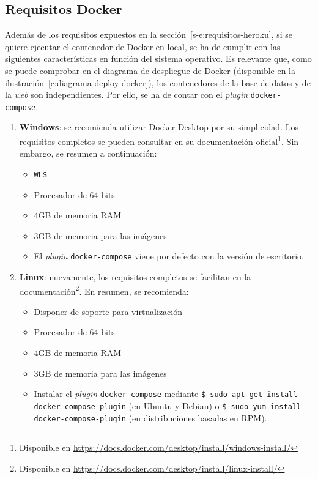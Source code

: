 \subsection{Requisitos Docker}
\label{s-e:requisitos-docker}

Además de los requisitos expuestos en la sección~\ref{s-e:requisitos-heroku}, si se quiere ejecutar el contenedor de Docker en local, se ha de cumplir con las siguientes características en función del sistema operativo. Es relevante que, como se puede comprobar en el diagrama de despliegue de Docker (disponible en la ilustración~\ref{c:diagrama-deploy-docker}), los contenedores de la base de datos y de la \textit{web} son independientes. Por ello, se ha de contar con el \textit{plugin} \texttt{docker-compose}.

\begin{enumerate}
	\item \textbf{Windows}: se recomienda utilizar Docker Desktop por su simplicidad. Los requisitos completos se pueden consultar en su documentación oficial\footnote{Disponible en \url{https://docs.docker.com/desktop/install/windows-install/}}. Sin embargo, se resumen a continuación:
	
	\begin{itemize}
		\item \texttt{WLS}
		\item Procesador de 64 bits
		\item 4GB de memoria RAM
		\item 3GB de memoria para las imágenes
		\item El \textit{plugin} \texttt{docker-compose} viene por defecto con la versión de escritorio.
	\end{itemize}

	\item \textbf{Linux}: nuevamente, los requisitos completos se facilitan en la documentación\footnote{Disponible en \url{https://docs.docker.com/desktop/install/linux-install/}}. En resumen, se recomienda:
	\begin{itemize}
		\item Disponer de soporte para virtualización
		\item Procesador de 64 bits
		\item 4GB de memoria RAM
		\item 3GB de memoria para las imágenes
		\item Instalar el \textit{plugin} \texttt{docker-compose} mediante \texttt{\$ sudo apt-get install docker-compose-plugin} (en Ubuntu y Debian) o \texttt{\$ sudo yum install docker-compose-plugin} (en distribuciones basadas en RPM).
	\end{itemize}
\end{enumerate}




